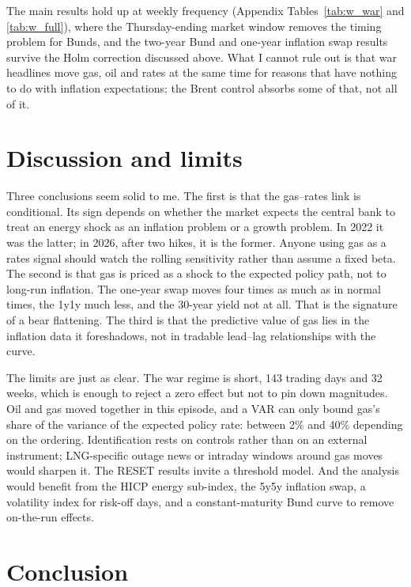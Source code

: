 \documentclass[11pt,a4paper]{article}
\begin{document}
The main results hold up at weekly frequency (Appendix Tables~\ref{tab:w_war} and \ref{tab:w_full}), where the
Thursday-ending market window removes the timing problem for Bunds, and the two-year Bund and one-year inflation swap
results survive the Holm correction discussed above. What I cannot rule out is that war headlines move
gas, oil and rates at the same time for reasons that have nothing to do with inflation expectations; the Brent control
absorbs some of that, not all of it.

\section{Discussion and limits}\label{sec:disc}

Three conclusions seem solid to me. The first is that the gas--rates link is conditional. Its sign depends on whether
the market expects the central bank to treat an energy shock as an inflation problem or a growth problem. In 2022 it
was the latter; in 2026, after two hikes, it is the former. Anyone using gas as a rates signal should watch the rolling
sensitivity rather than assume a fixed beta. The second is that gas is priced as a shock to the expected policy path,
not to long-run inflation. The one-year swap moves four times as much as in normal times, the 1y1y much less, and the
30-year yield not at all. That is the signature of a bear flattening. The third is that the predictive value of gas
lies in the inflation data it foreshadows, not in tradable lead--lag relationships with the curve.

The limits are just as clear. The war regime is short, 143 trading days and 32 weeks, which is enough to
reject a zero effect but not to pin down magnitudes. Oil and gas moved together in this episode, and a VAR can only
bound gas's share of the variance of the expected policy rate: between 2\% and 40\% depending on the
ordering. Identification rests on controls rather than on an external instrument; LNG-specific outage news or
intraday windows around gas moves would sharpen it. The RESET results invite a threshold model. And the analysis would
benefit from the HICP energy sub-index, the 5y5y inflation swap, a volatility index for risk-off days, and a
constant-maturity Bund curve to remove on-the-run effects.

\section{Conclusion}
\end{document}
